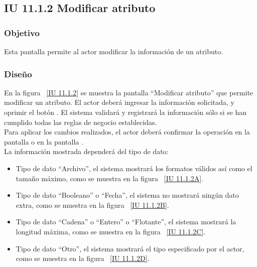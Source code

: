 \subsection{IU 11.1.2 Modificar atributo}

\subsubsection{Objetivo}
	
	Esta pantalla permite al actor modificar la información de un atributo.

\subsubsection{Diseño}

    En la figura ~\ref{IU 11.1.2} se muestra la pantalla ``Modificar atributo'' que permite modificar un atributo. El actor deberá ingresar la información solicitada,
    y oprimir el botón . El sistema validará y registrará la información sólo si se han cumplido todas las reglas de negocio establecidas.  \\
    
    Para aplicar los cambios realizados, el actor deberá confirmar la operación en la pantalla  o en la pantalla . \\
	
	La información mostrada dependerá del tipo de dato:
	\begin{itemize}
		\item Tipo de dato ``Archivo'', el sistema mostrará los formatos válidos así como el tamaño máximo, como se muestra en la figura ~\ref{IU 11.1.2A}.
		\item Tipo de dato ``Booleano'' o ``Fecha'', el sistema no mostrará ningún dato extra, como se muestra en la figura ~\ref{IU 11.1.2B}.
		\item Tipo de dato ``Cadena'' o ``Entero'' o ``Flotante'', el sistema mostrará la longitud máxima, como se muestra en la figura ~\ref{IU 11.1.2C}.
		\item Tipo de dato ``Otro'', el sistema mostrará el tipo especificado por el actor, como se muestra en la figura ~\ref{IU 11.1.2D}.
	\end{itemize}
	
	

